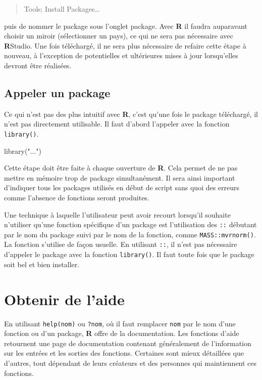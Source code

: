 \documentclass[
]{book}
\newenvironment{Shaded}{}{}
\newcommand{\FunctionTok}[1]{#1}
\newcommand{\NormalTok}[1]{#1}
\newcommand{\StringTok}[1]{#1}
\begin{document}
\begin{quote}
Tools;
Install Packages\ldots{}
\end{quote}

puis de nommer le package sous l'onglet package. Avec \textbf{R} il faudra auparavant choisir un miroir (sélectionner un pays), ce qui ne sera pas nécessaire avec \textbf{R}Studio. Une fois téléchargé, il ne sera plus nécessaire de refaire cette étape à nouveau, à l'exception de potentielles et ultérieures mises à jour lorsqu'elles devront être réalisées.

\hypertarget{appeler-un-package}{%
\subsection{Appeler un package}\label{appeler-un-package}}

Ce qui n'est pas des plus intuitif avec \textbf{R}, c'est qu'une fois le package téléchargé, il n'est pas directement utilisable. Il faut d'abord l'appeler avec la fonction \texttt{library()}.

\begin{Shaded}
\begin{Highlighting}[]
\FunctionTok{library}\NormalTok{(}\StringTok{"..."}\NormalTok{)}
\end{Highlighting}
\end{Shaded}

Cette étape doit être faite à chaque ouverture de \textbf{R}. Cela permet de ne pas mettre en mémoire trop de package simultanément. Il sera ainsi important d'indiquer tous les packages utilisés en début de script sans quoi des erreurs comme l'absence de fonctions seront produites.

Une technique à laquelle l'utilisateur peut avoir recourt lorsqu'il souhaite n'utiliser qu'une fonction spécifique d'un package est l'utilisation des \texttt{::} débutant par le nom du package suivi par le nom de la fonction, comme \texttt{MASS::mvrnorm()}. La fonction s'utilise de façon usuelle. En utilisant \texttt{::}, il n'est pas nécessaire d'appeler le package avec la fonction \texttt{library()}. Il faut toute fois que le package soit bel et bien installer.

\hypertarget{obtenir-de-laide}{%
\section{Obtenir de l'aide}\label{obtenir-de-laide}}

En utilisant \texttt{help(nom)} ou \texttt{?nom}, où il faut remplacer \texttt{nom} par le nom d'une fonction ou d'un package, \textbf{R} offre de la documentation. Les fonctions d'aide retournent une page de documentation contenant généralement de l'information sur les entrées et les sorties des fonctions. Certaines sont mieux détaillées que d'autres, tout dépendant de leurs créateurs et des personnes qui maintiennent ces fonctions.
\end{document}
